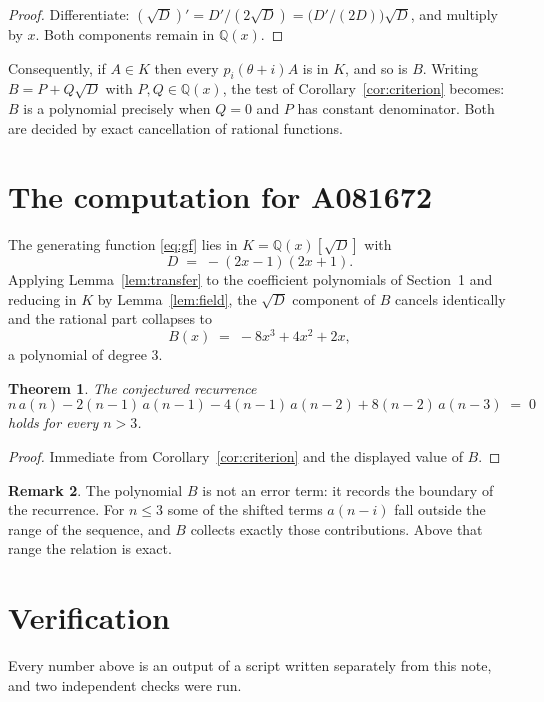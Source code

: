 \documentclass[11pt,a4paper]{article}
\theoremstyle{plain}
\newtheorem{theorem}{Theorem}
\theoremstyle{definition}
\newtheorem{remark}[theorem]{Remark}
\begin{document}
\begin{proof}
Differentiate: $(\sqrt{D})'=D'/(2\sqrt{D})=\bigl(D'/(2D)\bigr)\sqrt{D}$, and multiply by
$x$. Both components remain in $\mathbb{Q}(x)$.
\end{proof}

Consequently, if $A\in K$ then every $p_{i}(\theta+i)A$ is in $K$, and so is $B$. Writing
$B=P+Q\sqrt{D}$ with $P,Q\in\mathbb{Q}(x)$, the test of Corollary~\ref{cor:criterion}
becomes: $B$ is a polynomial precisely when $Q=0$ and $P$ has constant denominator. Both
are decided by exact cancellation of rational functions.

\section{The computation for A081672}

The generating function \eqref{eq:gf} lies in $K=\mathbb{Q}(x)[\sqrt{D}]$ with
\[
D \;=\; - \left(2 x - 1\right) \left(2 x + 1\right) .
\]
Applying Lemma~\ref{lem:transfer} to the coefficient polynomials of Section~1 and reducing
in $K$ by Lemma~\ref{lem:field}, the $\sqrt{D}$ component of $B$ cancels identically and
the rational part collapses to
\[
B(x)\;=\;- 8 x^{3} + 4 x^{2} + 2 x ,
\]
a polynomial of degree $3$.

\begin{theorem}
The conjectured recurrence
\[
n\,a(n) -  2 \left(n - 1\right)\,a(n-1) -  4 \left(n - 1\right)\,a(n-2) + 8 \left(n - 2\right)\,a(n-3) \;=\;0
\]
holds for every $n>3$.
\end{theorem}

\begin{proof}
Immediate from Corollary~\ref{cor:criterion} and the displayed value of $B$.
\end{proof}

\begin{remark}
The polynomial $B$ is not an error term: it records the boundary of the recurrence. For
$n\le3$ some of the shifted terms $a(n-i)$ fall outside the range of the sequence,
and $B$ collects exactly those contributions. Above that range the relation is exact.
\end{remark}

\section{Verification}

Every number above is an output of a script written separately from this note, and two
independent checks were run.
\end{document}
